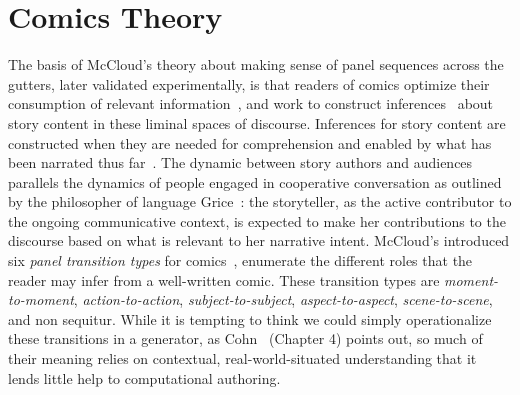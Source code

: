 \section{Comics Theory}

The basis of McCloud's theory about making sense of panel sequences across
the gutters, later validated experimentally, is that
readers of comics optimize their
consumption of relevant information~\cite{pirolli2007information}, and work
to construct inferences~\cite{magliano2016filling} about story content in
these liminal spaces of discourse.
Inferences for story content are constructed when
they are needed for comprehension and enabled by what has
been narrated thus far~\cite{myers1987degree}. The dynamic
between story authors and audiences parallels the dynamics of people
engaged in cooperative conversation as outlined by the philosopher of
language Grice~\cite{grice1975logic}: the storyteller, as the active contributor
to the ongoing communicative context, is expected to make her contributions
to the discourse based on what is relevant to her narrative intent. 
McCloud's introduced six {\em
panel transition types} for comics~\cite{mcCloud1993understanding}, 
enumerate the different roles that the reader may infer from a
well-written comic. These transition types are {\em moment-to-moment}, {\em
action-to-action}, {\em subject-to-subject}, {\em aspect-to-aspect}, {\em
scene-to-scene}, and non sequitur. While it is tempting to think we could
simply operationalize these transitions in a generator, as
Cohn~\cite{cohn2013visual} (Chapter 4) points out, so much of their meaning
relies on contextual, real-world-situated understanding that it lends
little help to computational authoring.

